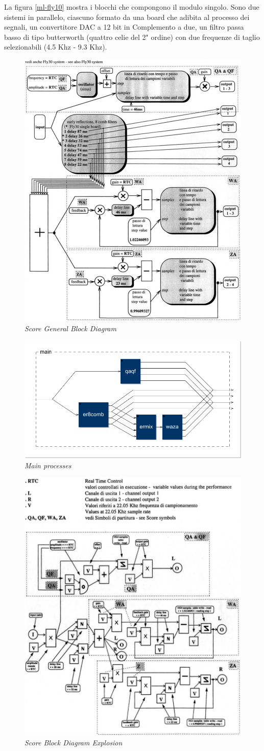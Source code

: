 \documentclass[twoside,a4paper]{article}
\begin{document}
La figura \ref{ml-fly10} mostra i blocchi che compongono il modulo singolo. Sono due sistemi in parallelo, ciascuno formato da una board che adibita al processo dei segnali, un convertitore DAC a 12 bit in Complemento a due, un filtro passa basso di tipo butterworth (quattro celie del 2" ordine) con due frequenze di taglio selezionabili (4.5 Khz - 9.3 Khz).

\begin{figure}[ht]
\centerline{\includegraphics[width=.45\textwidth]{img/1-comp}}
\caption{\label{ml-gen-dia}{\it Score General Block Diagram}}
\end{figure}

\begin{figure}[ht]
\centerline{\includegraphics[width=.45\textwidth]{img/main}}
\caption{\label{ml-main}{\it Main processes}}
\end{figure}

\begin{figure}[ht]
\centerline{\includegraphics[width=.45\textwidth]{img/2-comp}}
\caption{\label{ml-dia-exp}{\it Score Block Diagram Explosion}}
\end{figure}
\end{document}
